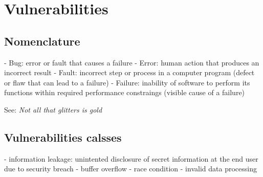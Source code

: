 \chapter{Vulnerabilities}
\section{Nomenclature}
 - Bug: error or fault that causes a failure
 - Error: human action that produces an incorrect result
 - Fault: incorrect step or process in a computer program (defect or flaw that can lead to a failure)
 - Failure: inability of software to perform its functions within required performance constraings (visible cause of a failure)

See: \textit{Not all that glitters is gold}

\section{Vulnerabilities calsses}
 - information leakage: unintented disclosure of secret information at the end user due to security breach
 - buffer overflow
 - race condition
 - invalid data processing
